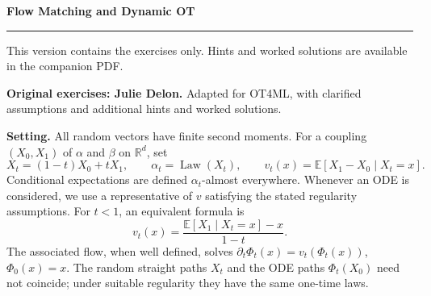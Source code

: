 \documentclass[11pt,a4paper]{article}
\theoremstyle{exostyle}
\newif\ifcorr
\newcommand{\R}{\mathbb{R}}
\renewcommand{\maketitle}{\thispagestyle{plain}\begingroup
  \color{heading}\LARGE\bfseries\SheetTitle\par\endgroup
  \vspace{3pt}{\large\ifcorr Statements, hints and worked solutions\else Exercise statements\fi}\par
  \vspace{7pt}\hrule\vspace{9pt}
  \ifcorr Each exercise is followed by question-by-question hints and a worked solution.
  Try the questions before reading the hints.\else
  This version contains the exercises only. Hints and worked solutions are available in the companion PDF.\fi
  \par\medskip}
\newcommand{\SheetTitle}{Flow Matching and Dynamic OT}
\newcommand{\EE}{\mathbb{E}}
\newcommand{\Law}{\operatorname{Law}}
\begin{document}
\maketitle
\textbf{Original exercises: Julie Delon.} Adapted for OT4ML, with clarified
assumptions and additional hints and worked solutions.

\textbf{Setting.} All random vectors have finite second moments.
For a coupling $(X_0,X_1)$ of $\alpha$ and $\beta$ on $\R^d$, set
\[
  X_t=(1-t)X_0+tX_1,\qquad
  \alpha_t=\Law(X_t),\qquad
  v_t(x)=\EE[X_1-X_0\mid X_t=x].
\]
Conditional expectations are defined $\alpha_t$-almost everywhere. Whenever
an ODE is considered, we use a representative of $v$ satisfying the stated
regularity assumptions. For $t<1$, an equivalent formula is
\begin{equation}\label{eq-fm-conditional}
  v_t(x)=\frac{\EE[X_1\mid X_t=x]-x}{1-t}.
\end{equation}
The associated flow, when well defined, solves
$\partial_t\Phi_t(x)=v_t(\Phi_t(x))$, $\Phi_0(x)=x$.
The random straight paths $X_t$ and the ODE paths $\Phi_t(X_0)$ need not
coincide; under suitable regularity they have the same one-time laws.
\end{document}

